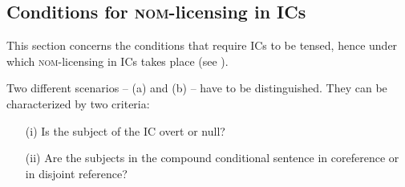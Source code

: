 \documentclass[output=paper,colorlinks,citecolor=brown,
modfonts,newtxmath
]{langscibook}
\begin{document}

\subsection{Conditions for \textsc{nom}-licensing in ICs}\label{sec:nom_conditions}

This section concerns the conditions that require ICs to be tensed, hence under which \textsc{nom}-licensing in ICs takes place (see ).

Two different scenarios -- (a) and (b) -- have to be distinguished. They can be characterized by two criteria:

\begin{itemize}
\item[(i)] Is the subject of the IC overt or null?
\item[(ii)] Are the subjects in the compound conditional sentence in coreference or in disjoint reference?
\end{itemize}

\end{document}
